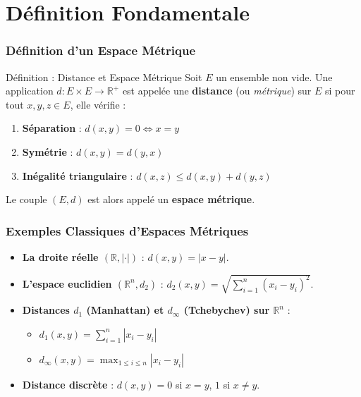 \documentclass{beamer}
\begin{document}
\section*{Définition Fondamentale}
\begin{frame}
    \frametitle{Définition d'un Espace Métrique}
    \begin{block}{Définition : Distance et Espace Métrique}
        Soit $E$ un ensemble non vide. Une application $d : E \times E \to \mathbb{R}^+$ est appelée une \textbf{distance} (ou \textit{métrique}) sur $E$ si pour tout $x, y, z \in E$, elle vérifie :
        \begin{enumerate}
            \item \textbf{Séparation} : $d(x, y) = 0 \iff x = y$
            \item \textbf{Symétrie} : $d(x, y) = d(y, x)$
            \item \textbf{Inégalité triangulaire} : $d(x, z) \le d(x, y) + d(y, z)$
        \end{enumerate}
        Le couple $(E, d)$ est alors appelé un \textbf{espace métrique}.
    \end{block}
\end{frame}

\begin{frame}
    \frametitle{Exemples Classiques d'Espaces Métriques}
    \begin{itemize}
        \item \textbf{La droite réelle $(\mathbb{R}, |\cdot|)$} : $d(x, y) = |x - y|$.
        \item \textbf{L'espace euclidien $(\mathbb{R}^n, d_2)$} : $d_2(x, y) = \sqrt{\sum_{i=1}^n (x_i - y_i)^2}$.
        \item \textbf{Distances $d_1$ (Manhattan) et $d_\infty$ (Tchebychev) sur $\mathbb{R}^n$} :
            \begin{itemize}
                \item $d_1(x, y) = \sum_{i=1}^n |x_i - y_i|$
                \item $d_\infty(x, y) = \max_{1 \le i \le n} |x_i - y_i|$
            \end{itemize}
        \item \textbf{Distance discrète} : $d(x, y) = 0$ si $x=y$, $1$ si $x \ne y$.
    \end{itemize}
\end{frame}

\end{document}
